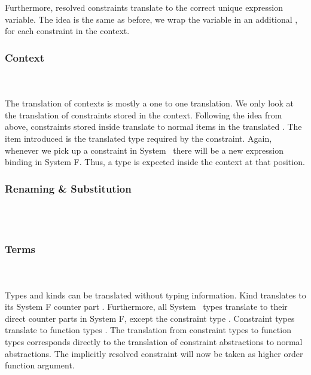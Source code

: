 \noindent Furthermore, resolved constraints translate to the correct unique expression variable. 
\DPTOVar
The idea is the same as before, we wrap the variable in an additional , for each constraint in the context.

\subsubsection{Context}\hfill\\\\
The translation of contexts is mostly a one to one translation. We only look at the translation of constraints stored in the context.
\DPTCtx
Following the idea from above, constraints  \Constr{:}  stored inside  translate to normal items in the translated . The item introduced is the translated type   required by the constraint. Again, whenever we pick up a constraint in System \Fo\, there will be a new expression binding in System F. Thus, a type is expected inside the context at that position.

\subsubsection{Renaming \& Substitution}\hfill\\\\
\DPTRen

\DPTSub

\subsubsection{Terms}\hfill\\\\
Types and kinds can be translated without typing information. Kind  translates to its System F counter part . 
Furthermore, all System \Fo\ types translate to their direct counter parts in System F, except the constraint type \Constr{[}  \Constr{:}  \Constr{]⇒} .
\DPTType
Constraint types  \Constr{[}  \Constr{:}  \Constr{]⇒}  translate to function types   . 
The translation from constraint types to function types corresponds directly to the translation of constraint abstractions to normal abstractions. The implicitly resolved constraint will now be taken as higher order function argument.

